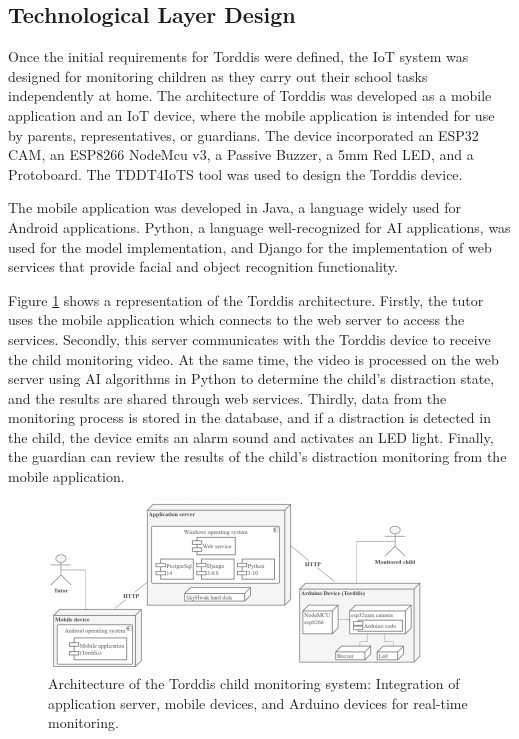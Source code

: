 \documentclass[a4paper,fleqn]{cas-sc}
\begin{document}
		\subsection{Technological Layer Design}
			Once the initial requirements for Torddis were defined, the IoT system was designed for monitoring children as they carry out their school tasks independently at home. The architecture of Torddis was developed as a mobile application and an IoT device, where the mobile application is intended for use by parents, representatives, or guardians. The device incorporated an ESP32 CAM, an ESP8266 NodeMcu v3, a Passive Buzzer, a 5mm Red LED, and a Protoboard. The TDDT4IoTS tool was used to design the Torddis device.
			
			The mobile application was developed in Java, a language widely used for Android applications. Python, a language well-recognized for AI applications, was used for the model implementation, and Django for the implementation of web services that provide facial and object recognition functionality.
			
			Figure \ref{fig:TorddisArchitecture} shows a representation of the Torddis architecture. Firstly, the tutor uses the mobile application which connects to the web server to access the services. Secondly, this server communicates with the Torddis device to receive the child monitoring video. At the same time, the video is processed on the web server using AI algorithms in Python to determine the child’s distraction state, and the results are shared through web services. Thirdly, data from the monitoring process is stored in the database, and if a distraction is detected in the child, the device emits an alarm sound and activates an LED light. Finally, the guardian can review the results of the child’s distraction monitoring from the mobile application.
			
			\begin{figure}[htb!]
				\centering
				\includegraphics[frame,scale=0.5, width=\linewidth]{figs/Figure_5}
				\caption{Architecture of the Torddis child monitoring system: Integration of application server, mobile devices, and Arduino devices for real-time monitoring.\label{fig:TorddisArchitecture}}
			\end{figure} 
			
\end{document}

